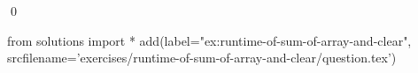 \begin{ex}
  \label{ex:runtime-of-sum-of-array-and-clear}
  
\mbox{}\\ \\
\qed
\end{ex}
\begin{python0}
from solutions import *
add(label="ex:runtime-of-sum-of-array-and-clear",
    srcfilename='exercises/runtime-of-sum-of-array-and-clear/question.tex') 
\end{python0}                              
